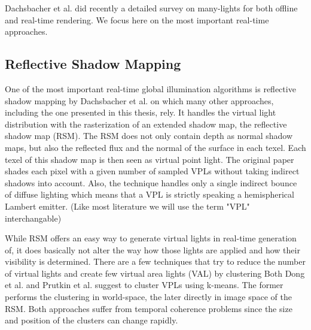\documentclass[thesis.tex]{subfiles}
\begin{document}
Dachsbacher et al. \cite{bib:manylightssurvey2014} did recently a detailed survey on many-lights for both offline and real-time rendering.
We focus here on the most important real-time approaches.

\subsection{Reflective Shadow Mapping}
One of the most important real-time global illumination algorithms is reflective shadow mapping by Dachsbacher et al. \cite{bib:reflectiveshadowmaps} on which many other approaches, including the one presented in this thesis, rely.
It handles the virtual light distribution with the rasterization of an extended shadow map, the reflective shadow map (RSM).
The RSM does not only contain depth as normal shadow maps, but also the reflected flux and the normal of the surface in each texel.
Each texel of this shadow map is then seen as virtual point light.
The original paper shades each pixel with a given number of sampled VPLs without taking indirect shadows into account.
Also, the technique handles only a single indirect bounce of diffuse lighting which means that a VPL is strictly speaking a hemispherical Lambert emitter.
(Like most literature we will use the term "VPL" interchangable)

While RSM offers an easy way to generate virtual lights in real-time generation of, it does basically not alter the way how those lights are applied and how their visibility is determined.
There are a few techniques that try to reduce the number of virtual lights and create few virtual area lights (VAL) by clustering
Both Dong et al. \cite{bib:clusturedvisiblity:dong} and Prutkin et al. \cite{bib:clusturedvisiblity:prutkin} suggest to cluster VPLs using k-means.
The former performs the clustering in world-space, the later directly in image space of the RSM.
Both approaches suffer from temporal coherence problems since the size and position of the clusters can change rapidly.
\end{document}
